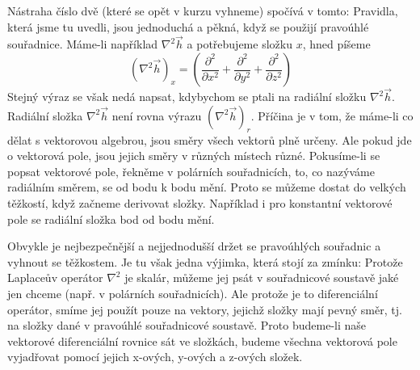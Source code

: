       Nástraha číslo dvě (které se opět v kurzu vyhneme) spočívá v tomto: Pravidla, která jsme tu 
      uvedli, jsou jednoduchá a pěkná, když se použijí pravoúhlé souřadnice. Máme-li například 
      \(\nabla^2\vec{h}\) a potřebujeme složku \(x\), hned píšeme
      \begin{equation*}
        (\nabla^2\vec{h})_x = \left(\frac{\partial^2}{\partial x^2} + 
                                    \frac{\partial^2}{\partial y^2} + 
                                    \frac{\partial^2}{\partial z^2} 
                              \right)
      \end{equation*}
      Stejný výraz se však nedá napsat, kdybychom se ptali na radiální složku \(\nabla^2\vec{h}\). 
      Radiální složka \(\nabla^2\vec{h}\) není rovna výrazu \((\nabla^2\vec{h})_r\). Příčina je v 
      tom, že máme-li co dělat s vektorovou algebrou, jsou směry všech vektorů plně určeny. Ale pokud 
      jde o vektorová pole, jsou jejich směry v různých místech různé. Pokusíme-li se popsat 
      vektorové pole, řekněme v polárních souřadnicích, to, co nazýváme radiálním směrem, se od bodu 
      k bodu mění. Proto se můžeme dostat do velkých těžkostí, když začneme derivovat složky. 
      Například i pro konstantní vektorové pole se radiální složka bod od bodu mění.
  
      Obvykle je nejbezpečnější a nejjednodušší držet se pravoúhlých souřadnic a vyhnout se těžkostem.
      Je tu však jedna výjimka, která stojí za zmínku: Protože Laplaceův operátor \(\nabla^2\) je
      skalár, můžeme jej psát v souřadnicové soustavě jaké jen chceme (např. v polárních
      souřadnicích). Ale protože je to diferenciální operátor, smíme jej použít pouze na vektory,
      jejichž složky mají pevný směr, tj. na složky dané v pravoúhlé souřadnicové soustavě. Proto
      budeme-li naše vektorové diferenciální rovnice sát ve složkách, budeme všechna vektorová pole
      vyjadřovat pomocí jejich x-ových, y-ových a z-ových složek.
  
